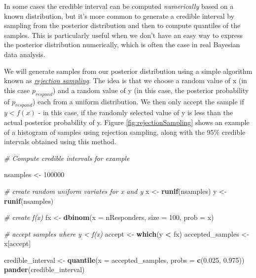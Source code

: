\documentclass[]{book}
\newenvironment{Shaded}{\begin{snugshade}}{\end{snugshade}}
\newcommand{\KeywordTok}[1]{\textcolor[rgb]{0.13,0.29,0.53}{\textbf{#1}}}
\newcommand{\DataTypeTok}[1]{\textcolor[rgb]{0.13,0.29,0.53}{#1}}
\newcommand{\DecValTok}[1]{\textcolor[rgb]{0.00,0.00,0.81}{#1}}
\newcommand{\FloatTok}[1]{\textcolor[rgb]{0.00,0.00,0.81}{#1}}
\newcommand{\StringTok}[1]{\textcolor[rgb]{0.31,0.60,0.02}{#1}}
\newcommand{\CommentTok}[1]{\textcolor[rgb]{0.56,0.35,0.01}{\textit{#1}}}
\newcommand{\OperatorTok}[1]{\textcolor[rgb]{0.81,0.36,0.00}{\textbf{#1}}}
\newcommand{\NormalTok}[1]{#1}
\theoremstyle{definition}
\theoremstyle{definition}
\theoremstyle{definition}
\theoremstyle{remark}
\begin{document}
In some cases the credible interval can be computed \emph{numerically}
based on a known distribution, but it's more common to generate a
credible interval by sampling from the posterior distribution and then
to compute quantiles of the samples. This is particularly useful when we
don't have an easy way to express the posterior distribution
numerically, which is often the case in real Bayesian data analysis.

We will generate samples from our posterior distribution using a simple
algorithm known as
\href{https://am207.github.io/2017/wiki/rejectionsampling.html}{\emph{rejection
sampling}}. The idea is that we choose a random value of x (in this case
\(p_{respond}\)) and a random value of y (in this case, the posterior
probability of \(p_{respond}\)) each from a uniform distribution. We
then only accept the sample if \(y < f(x)\) - in this case, if the
randomly selected value of y is less than the actual posterior
probability of y. Figure \ref{fig:rejectionSampling} shows an example of
a histogram of samples using rejection sampling, along with the 95\%
credible intervals obtained using this method.

\begin{Shaded}
\begin{Highlighting}[]
\CommentTok{# Compute credible intervals for example}

\NormalTok{nsamples <-}\StringTok{ }\DecValTok{100000}

\CommentTok{# create random uniform variates for x and y}
\NormalTok{x <-}\StringTok{ }\KeywordTok{runif}\NormalTok{(nsamples)}
\NormalTok{y <-}\StringTok{ }\KeywordTok{runif}\NormalTok{(nsamples)}

\CommentTok{# create f(x)}
\NormalTok{fx <-}\StringTok{ }\KeywordTok{dbinom}\NormalTok{(}\DataTypeTok{x =}\NormalTok{ nResponders, }\DataTypeTok{size =} \DecValTok{100}\NormalTok{, }\DataTypeTok{prob =}\NormalTok{ x)}

\CommentTok{# accept samples where y < f(x)}
\NormalTok{accept <-}\StringTok{ }\KeywordTok{which}\NormalTok{(y }\OperatorTok{<}\StringTok{ }\NormalTok{fx)}
\NormalTok{accepted_samples <-}\StringTok{ }\NormalTok{x[accept]}

\NormalTok{credible_interval <-}\StringTok{ }\KeywordTok{quantile}\NormalTok{(}\DataTypeTok{x =}\NormalTok{ accepted_samples, }\DataTypeTok{probs =} \KeywordTok{c}\NormalTok{(}\FloatTok{0.025}\NormalTok{, }\FloatTok{0.975}\NormalTok{))}
\KeywordTok{pander}\NormalTok{(credible_interval)}
\end{Highlighting}
\end{Shaded}
\end{document}
